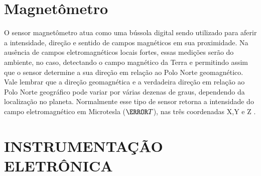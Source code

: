 \section{Magnetômetro}


O sensor magnetômetro atua como uma bússola digital sendo utilizado para aferir a intensidade, direção e sentido de campos magnéticos em sua proximidade. Na ausência de campos eletromagnéticos locais fortes, essas medições serão do ambiente, no caso, detectando o campo magnético da Terra e permitindo assim que o sensor determine a sua direção em relação ao Polo Norte geomagnético. Vale lembrar que a  direção geomagnética e a verdadeira direção em relação ao Polo Norte geográfico pode variar por várias dezenas de graus, dependendo da localização no planeta. Normalmente esse tipo de sensor retorna a intensidade do campo eletromagnético em Microtesla ($\micro T$), nas três coordenadas X,Y e Z \cite{Jepson2011}.

\newpage























\newpage
\section {INSTRUMENTAÇÃO ELETRÔNICA}



